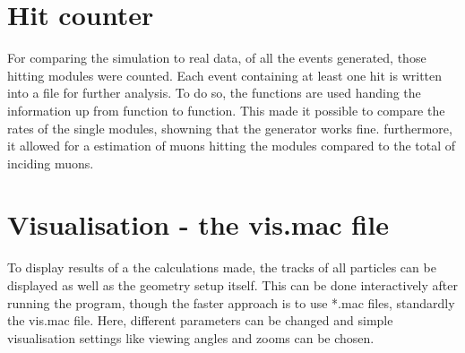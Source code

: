   \section{Hit counter}
  \label{ch:Simulation software:sec:Hit counter}
  
  For comparing the simulation to real data, of all the events generated, those hitting modules were counted. Each event containing at least one hit is written into a file for further analysis. To do so, the functions  are used handing the information up from function to function. This made it possible to compare the rates of the single modules, showning that the generator works fine. furthermore, it allowed for a estimation of muons hitting the modules compared to the total of inciding muons.
  
  
  \section{Visualisation - the vis.mac file}
  \label{ch:Simulation software:sec:Visualisation}
  
  To display results of a the calculations made, the tracks of all particles can be displayed as well as the geometry setup itself. This can be done interactively after running the program, though the faster approach is to use *.mac files, standardly the vis.mac file. Here, different parameters can be changed and simple visualisation settings like viewing angles and zooms can be chosen.
  